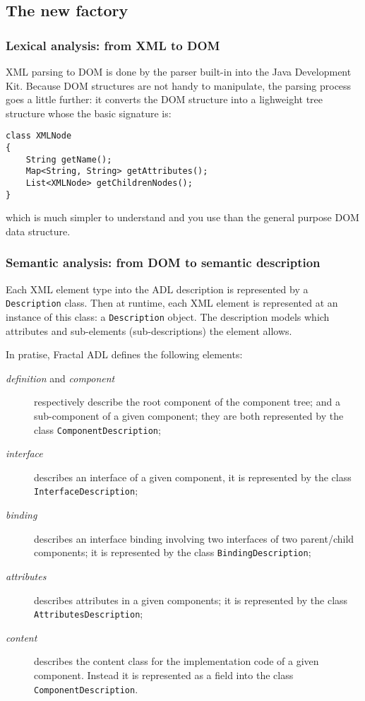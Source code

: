 \documentclass{article}
\newcommand{\code}[1]{\texttt{#1}}
\newcommand{\xml}[1]{\textsl{#1}}
\begin{document}
\subsection{The new factory}


\subsubsection{Lexical analysis: from XML to DOM}

XML parsing to DOM is done by the parser built-in into the Java Development Kit.
Because DOM structures are not handy to manipulate, the parsing process goes a little
further: it converts the DOM structure into a lighweight tree structure whose the
basic signature is:

\begin{lstlisting}
class XMLNode
{
	String getName();
	Map<String, String> getAttributes();
	List<XMLNode> getChildrenNodes();
}
\end{lstlisting}
which is much simpler to understand and you use than the general purpose DOM data structure.

\subsubsection{Semantic analysis: from DOM to semantic description}

Each XML element type into the ADL description is represented by a  \code{Description} class.
Then at runtime, each XML element is represented at an instance of this class: a  \code{Description} object.
The description models which attributes and sub-elements (sub-descriptions) the element allows.

In pratise, Fractal ADL  defines the following elements:
\begin{description}
\item[\xml{definition} and \xml{component}] respectively describe  the root component of the component tree;
and a sub-component of a given component; they are both represented by the class \code{ComponentDescription};
\item[\xml{interface}] describes an interface of a given component, it is represented by the class \code{InterfaceDescription};
\item[\xml{binding}] describes an interface binding involving two interfaces of two parent/child components;
it is represented by the class \code{BindingDescription};
\item[\xml{attributes}] describes attributes in a given components; it is represented by the class \code{AttributesDescription};
\item[\xml{content}] describes the content class for the implementation code of a given component. Instead it is represented as a field into the class \code{ComponentDescription}.
\end{description}
\end{document}
